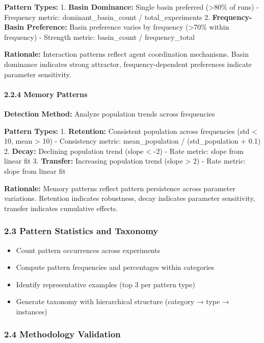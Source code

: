 \documentclass[
]{article}
\providecommand{\tightlist}{%
  \setlength{\itemsep}{0pt}\setlength{\parskip}{0pt}}
\begin{document}
\textbf{Pattern Types:} 1. \textbf{Basin Dominance:} Single basin
preferred (\textgreater80\% of runs) - Frequency metric:
dominant\_basin\_count / total\_experiments 2. \textbf{Frequency-Basin
Preference:} Basin preference varies by frequency (\textgreater70\%
within frequency) - Strength metric: basin\_count / frequency\_total

\textbf{Rationale:} Interaction patterns reflect agent coordination
mechanisms. Basin dominance indicates strong attractor,
frequency-dependent preferences indicate parameter sensitivity.

\paragraph{2.2.4 Memory Patterns}\label{memory-patterns}

\textbf{Detection Method:} Analyze population trends across frequencies

\textbf{Pattern Types:} 1. \textbf{Retention:} Consistent population
across frequencies (std \textless{} 10, mean \textgreater{} 10) -
Consistency metric: mean\_population / (std\_population + 0.1) 2.
\textbf{Decay:} Declining population trend (slope \textless{} -2) - Rate
metric: \textbar slope\textbar{} from linear fit 3. \textbf{Transfer:}
Increasing population trend (slope \textgreater{} 2) - Rate metric:
slope from linear fit

\textbf{Rationale:} Memory patterns reflect pattern persistence across
parameter variations. Retention indicates robustness, decay indicates
parameter sensitivity, transfer indicates cumulative effects.

\subsubsection{2.3 Pattern Statistics and
Taxonomy}\label{pattern-statistics-and-taxonomy}

\begin{itemize}
\tightlist
\item
  Count pattern occurrences across experiments
\item
  Compute pattern frequencies and percentages within categories
\item
  Identify representative examples (top 3 per pattern type)
\item
  Generate taxonomy with hierarchical structure (category → type →
  instances)
\end{itemize}

\subsubsection{2.4 Methodology Validation}\label{methodology-validation}
\end{document}
